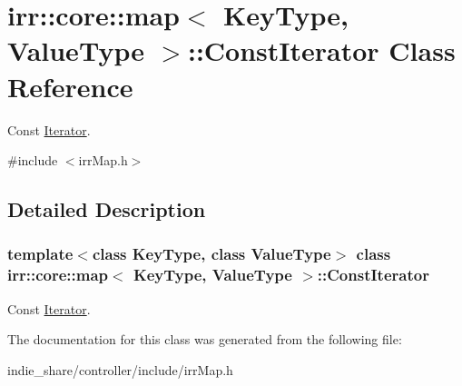 \hypertarget{classirr_1_1core_1_1map_1_1ConstIterator}{}\section{irr\+:\+:core\+:\+:map$<$ Key\+Type, Value\+Type $>$\+:\+:Const\+Iterator Class Reference}
\label{classirr_1_1core_1_1map_1_1ConstIterator}


Const \hyperlink{classirr_1_1core_1_1map_1_1Iterator}{Iterator}.  




{\ttfamily \#include $<$irr\+Map.\+h$>$}



\subsection{Detailed Description}
\subsubsection*{template$<$class Key\+Type, class Value\+Type$>$\newline
class irr\+::core\+::map$<$ Key\+Type, Value\+Type $>$\+::\+Const\+Iterator}

Const \hyperlink{classirr_1_1core_1_1map_1_1Iterator}{Iterator}. 

The documentation for this class was generated from the following file\+:\begin{DoxyCompactItemize}
\item 
indie\+\_\+share/controller/include/irr\+Map.\+h\end{DoxyCompactItemize}
